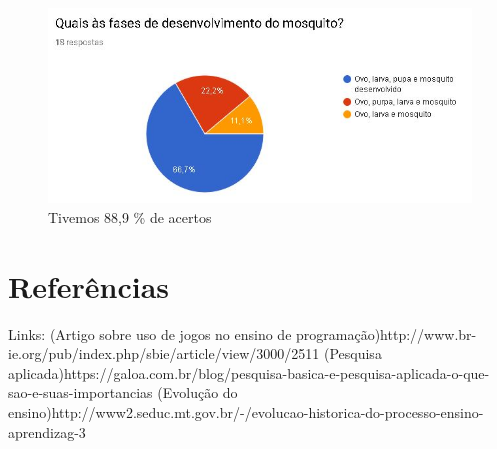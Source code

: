 \documentclass[12pt]{article}
\begin{document}
	\begin{figure}[H]
		\centering
		\caption{Tivemos 88,9 \% de acertos}
		\includegraphics[width=0.7\linewidth]{Figuras/Pergunta_5}
		
		\label{fig:pergunta5}
	\end{figure}
	
	\section{Referências} 
	
	Links: 	(Artigo sobre uso de jogos no ensino de programação)http://www.br-ie.org/pub/index.php/sbie/article/view/3000/2511
			(Pesquisa aplicada)https://galoa.com.br/blog/pesquisa-basica-e-pesquisa-aplicada-o-que-sao-e-suas-importancias
			(Evolução do ensino)http://www2.seduc.mt.gov.br/-/evolucao-historica-do-processo-ensino-aprendizag-3
	
	
	
\end{document}
